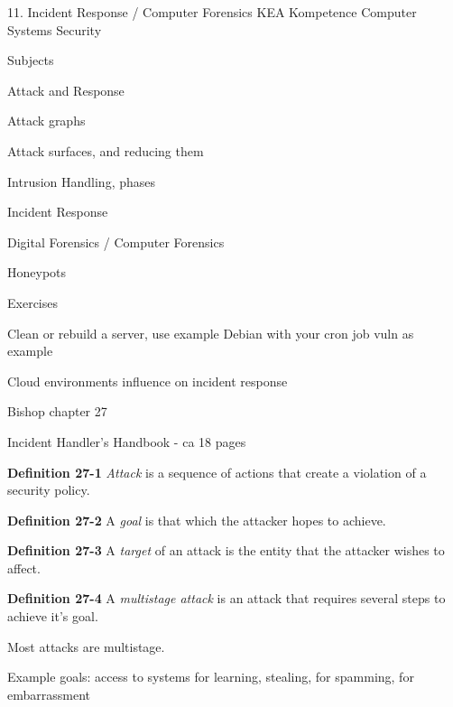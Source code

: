 \documentclass[Screen16to9,17pt]{foils}
\begin{document}
\mytitlepage
{11. Incident Response / Computer Forensics}
{KEA Kompetence Computer Systems Security \the\year}



\begin{list1}
\item Subjects
\begin{list2}
\item Attack and Response
\item Attack graphs
\item Attack surfaces, and reducing them
\item Intrusion Handling, phases
\item Incident Response
\item Digital Forensics / Computer Forensics
\item Honeypots
\end{list2}
\item Exercises
\begin{list2}
\item Clean or rebuild a server, use example Debian with your cron job vuln as example

\item Cloud environments influence on incident response
\end{list2}
\end{list1}




\begin{list1}
\item Bishop chapter 27
\item Incident Handler's Handbook - ca 18 pages
\end{list1}



\begin{list1}
\item {\bf Definition 27-1} \emph{Attack} is a sequence of actions that create a violation of a security policy.
\item {\bf Definition 27-2} A \emph{goal} is that which the attacker hopes to achieve.
\item {\bf Definition 27-3} A \emph{target} of an attack is the entity that the attacker wishes to affect.
\item {\bf Definition 27-4} A \emph{multistage attack} is an attack that requires several steps to achieve it's goal.
\item Most attacks are multistage.
\item Example goals: access to systems for learning, stealing,  for spamming, for embarrassment
\end{list1}
\end{document}

